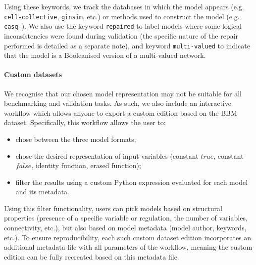 \documentclass[fleqn,10pt]{wlscirep}
\begin{document}
Using these keywords, we track the databases in which the model appears (e.g. \texttt{cell-collective}, \texttt{ginsim}, etc.) or methods used to construct the model (e.g. \texttt{casq}~\cite{casq}). We also use the keyword \texttt{repaired} to label models where some logical inconsistencies were found during validation (the specific nature of the repair performed is detailed as a separate note), and keyword \texttt{multi-valued} to indicate that the model is a Booleanised version of a multi-valued network.

\paragraph*{Custom datasets}

We recognise that our chosen model representation may not be suitable for all benchmarking and validation tasks. As such, we also include an interactive workflow which allows anyone to export a custom edition based on the BBM dataset. Specifically, this workflow allows the user to:

\begin{itemize}
	\item chose between the three model formats;
	\item chose the desired representation of input variables (constant $\mathit{true}$, constant $\mathit{false}$, identity function, erased function);
	\item filter the results using a custom Python expression evaluated for each model and its metadata.
\end{itemize}

Using this filter functionality, users can pick models based on structural properties (presence of a specific variable or regulation, the number of variables, connectivity, etc.), but also based on model metadata (model author, keywords, etc.). To ensure reproducibility, each such custom dataset edition incorporates an additional metadata file with all parameters of the workflow, meaning the custom edition can be fully recreated based on this metadata file.

\end{document}
